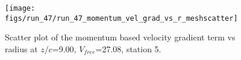 \begin{figure}[H]
\centering
\texttt{[image: figs/run\_47/run\_47\_momentum\_vel\_grad\_vs\_r\_meshscatter]}
\caption{Scatter plot of the momentum based velocity gradient term vs radius at $z/c$=9.00, $V_{free}$=27.08, station 5.}
\label{fig:run_47_momentum_vel_grad_vs_r_meshscatter}
\end{figure}


